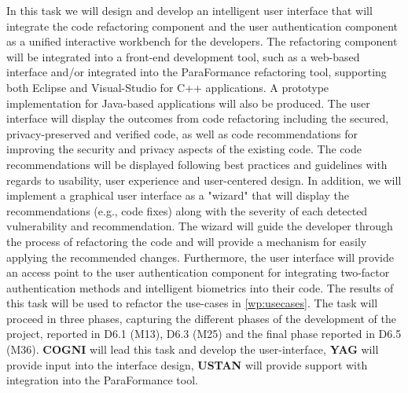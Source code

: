 \begin{Workpackage}{\thewpno}
\begin{WPDescription}
\end{WPDescription}

\begin{Task}
\TaskResults{%
}
\TaskHeader{}
In this task we will design and develop an intelligent user interface that will integrate the code refactoring component and the user authentication component as a unified interactive workbench for the developers. The refactoring component will be integrated into a front-end development tool, such as a web-based interface and/or integrated into the ParaFormance refactoring tool, supporting both Eclipse and Visual-Studio for C++ applications. A prototype implementation for Java-based applications will also be produced. The user interface will display the outcomes from code refactoring including the secured, privacy-preserved and verified code, as well as code recommendations for improving the security and privacy aspects of the existing code. The code recommendations will be displayed following best practices and guidelines with regards to usability, user experience and user-centered design. In addition, we will implement a graphical user interface as a "wizard" that will display the recommendations (e.g., code fixes) along with the severity of each detected vulnerability and recommendation. The wizard will guide the developer through the process of refactoring the code and will provide a mechanism for easily applying the recommended changes. Furthermore, the user interface will provide an access point to the user authentication component for integrating two-factor authentication methods and intelligent biometrics into their code. The results of this task will be used to refactor the use-cases in \ref{wp:usecases}. The task will proceed in three phases, capturing the different phases of the development of the project, reported in D6.1 (M13), D6.3 (M25) and the final phase reported in D6.5 (M36). \textbf{COGNI} will lead this task and develop the user-interface, \textbf{YAG} will provide input into the interface design, \textbf{USTAN} will provide support with integration into the ParaFormance tool.




\end{Task}
\end{Workpackage}
